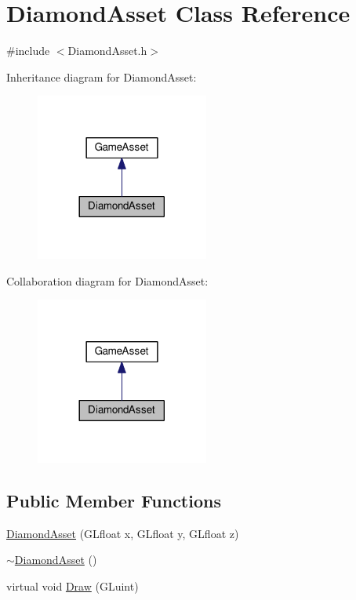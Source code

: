 \hypertarget{classDiamondAsset}{}\section{Diamond\+Asset Class Reference}
\label{classDiamondAsset}


{\ttfamily \#include $<$Diamond\+Asset.\+h$>$}



Inheritance diagram for Diamond\+Asset\+:\nopagebreak
\begin{figure}[H]
\begin{center}
\leavevmode
\includegraphics[width=161pt]{classDiamondAsset__inherit__graph}
\end{center}
\end{figure}


Collaboration diagram for Diamond\+Asset\+:\nopagebreak
\begin{figure}[H]
\begin{center}
\leavevmode
\includegraphics[width=161pt]{classDiamondAsset__coll__graph}
\end{center}
\end{figure}
\subsection*{Public Member Functions}
\begin{DoxyCompactItemize}
\item 
\hyperlink{classDiamondAsset_a6140b65eb30ad5a4141fec20ec7f8fad}{Diamond\+Asset} (G\+Lfloat x, G\+Lfloat y, G\+Lfloat z)
\item 
\hyperlink{classDiamondAsset_a1b7bf6ba76651a9304943f2c41fe36b8}{$\sim$\+Diamond\+Asset} ()
\item 
virtual void \hyperlink{classDiamondAsset_a0c259031894623285b3b511321c73abb}{Draw} (G\+Luint)
\end{DoxyCompactItemize}


